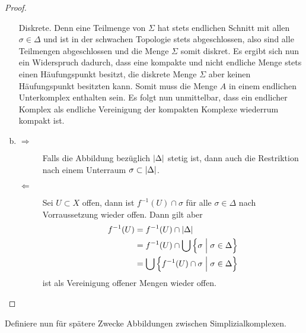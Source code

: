 \begin{Satz}
\begin{proof}
\begin{enumerate}[(a)]
            Diskrete. Denn eine Teilmenge von $\Sigma$ hat stets
            endlichen Schnitt mit allen $\sigma \in \Delta$ und ist in
            der schwachen Topologie stets abgeschlossen, also sind
            alle Teilmengen abgeschlossen und die Menge $\Sigma$ somit
            diskret.
            Es ergibt sich nun ein Widerspruch dadurch, dass eine
            kompakte und nicht endliche Menge stets einen
            Häufungspunkt besitzt, die diskrete Menge $\Sigma$ aber
            keinen Häufungspunkt besitzten kann.
            Somit muss die Menge $A$ in einem endlichen Unterkomplex
            enthalten sein. Es folgt nun unmittelbar, dass ein endlicher
            Komplex als endliche Vereinigung der kompakten Komplexe
            wiederrum kompakt ist.
          \item 
            \begin{description}
            \item[\glqq $\Rightarrow$\grqq] Falls die Abbildung
              bezüglich $\left| \Delta \right|$ stetig ist, dann auch die
              Restriktion nach einem Unterraum
              $\sigma \subset \left| \Delta \right|$.
            \item[\glqq $\Leftarrow$ \grqq] Sei $U \subset X$ offen,
              dann ist $f^{-1}(U) \cap \sigma$ für alle
              $\sigma \in \Delta$ nach Vorraussetzung wieder offen.
              Dann gilt aber
              \begin{align*}
                f^{-1}(U) &= f^{-1} (U) \cap \gr{\Delta} \\ 
                          &= f^{-1} (U) \cap \bigcup \set{\sigma }%
                            { \sigma \in \Delta} \\ 
                          &= \bigcup \set{ f^{-1}(U) \cap \sigma }%
                            { \sigma \in \Delta}
              \end{align*}
              ist als Vereinigung offener Mengen wieder offen.
            \end{description}
          \end{enumerate}
	\end{proof}
\end{Satz}

Definiere nun für spätere Zwecke Abbildungen zwischen Simplizialkomplexen.

